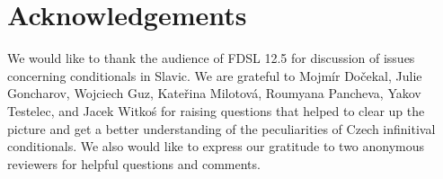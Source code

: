 \documentclass[output=paper,colorlinks,citecolor=brown,newtxmath]{langsci/langscibook}
\begin{document}
\section*{Acknowledgements}

We would like to thank the audience of FDSL 12.5 for discussion of issues concerning conditionals in Slavic. We are grateful to Mojmír Dočekal, Julie Goncharov, Wojciech Guz, Kateřina Milotová, Roumyana Pancheva, Yakov Testelec, and Jacek Witkoś for raising questions that helped to clear up the picture and get a better understanding of the peculiarities of Czech infinitival conditionals. We also would like to express our gratitude to two anonymous reviewers for helpful questions and comments.

{\sloppy
\printbibliography[heading=subbibliography,notkeyword=this]
}

\end{document}
